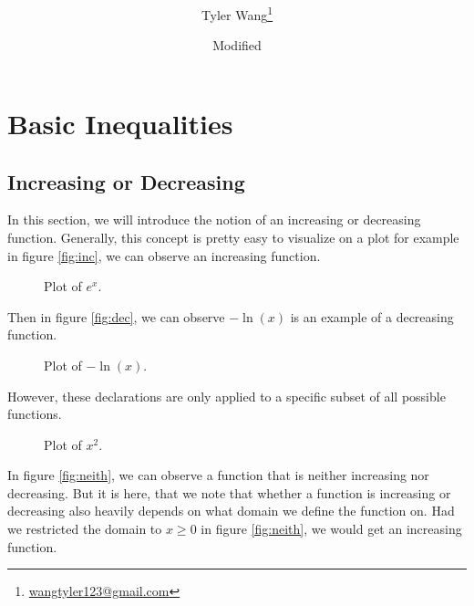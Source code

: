 \documentclass[11pt]{article}
\title{\mytitle \\ [2ex] \Large \mysubtitle}
\date{\small Modified \mydate}
\author {Tyler Wang\thanks{
\href{mailto:wangtyler123@gmail.com}{wangtyler123@gmail.com}}}
\numberwithin{lemma}{section}
\numberwithin{equation}{section}
\numberwithin{define}{section}
\numberwithin{prop}{section}
\numberwithin{figure}{section}
\numberwithin{theorem}{section}
\numberwithin{cor}{section}
\newcounter{ex}[section]
\numberwithin{ex}{section}
\begin{document}
\maketitle
\section{Basic Inequalities}
\subsection{Increasing or Decreasing}
In this section, we will introduce the notion of an increasing or decreasing function. Generally, this concept is pretty easy to visualize on a plot for example in figure \eqref{fig:inc}, we can observe an increasing function.
\begin{figure}[h]
\centering
	\caption{Plot of $e^x$.}
	\label{fig:inc}
\end{figure}
Then in figure \eqref{fig:dec}, we can observe $-\ln(x)$ is an example of a decreasing function.
\begin{figure}[h]
\centering
	\caption{Plot of $-\ln(x)$.}
	\label{fig:dec}
\end{figure}
However, these declarations are only applied to a specific subset of all possible functions.
\begin{figure}[h]
\centering
	\caption{Plot of $x^2$.}
	\label{fig:neith}
\end{figure}
In figure \eqref{fig:neith}, we can observe a function that is neither increasing nor decreasing. But it is here, that we note that whether a function is increasing or decreasing also heavily depends on what domain we define the function on. Had we restricted the domain to $x\ge0$ in figure \eqref{fig:neith}, we would get an increasing function.
\end{document}
